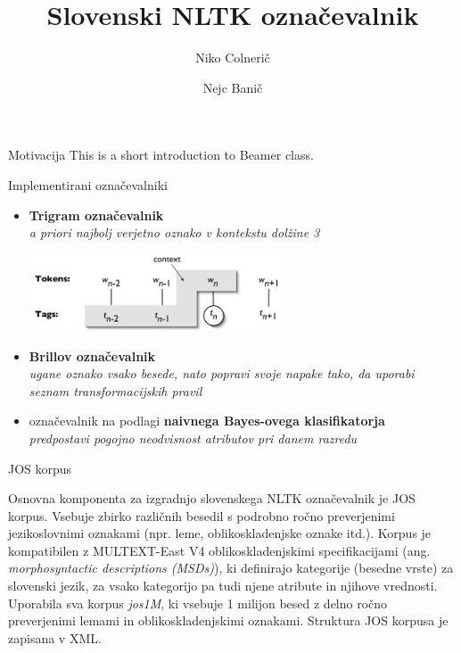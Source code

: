 \documentclass{beamer}
\title[Slovenski NLTK označevalnik]{Slovenski NLTK označevalnik}
\author{
	Niko Colnerič
	\and
	Nejc Banič}
\institute{ Fakulteta za Računalništvo in Informtiko\\
			Univerza v Ljubljani}
\begin{document}
\begin{frame}
\titlepage
\end{frame}

\begin{frame}{Motivacija}
This is a short introduction to Beamer class.
\end{frame}

\begin{frame}{Implementirani označevalniki}
\begin{itemize}
\item \textbf{Trigram označevalnik}\\
\textit{a priori najbolj verjetno oznako v kontekstu dolžine 3}
\begin{center}
\includegraphics[width=0.6\textwidth]{../paper/tag-context.png}
\end{center}

\item \textbf{Brillov označevalnik}\\
\textit{ugane oznako vsako besede, nato 
popravi svoje napake tako, da uporabi seznam transformacijskih pravil}
\item označevalnik na podlagi \textbf{naivnega Bayes-ovega klasifikatorja}\\
\textit{predpostavi pogojno neodvisnost atributov pri danem razredu}
\end{itemize}
\end{frame}

\begin{frame}{JOS korpus}

Osnovna komponenta za izgradnjo slovenskega NLTK označevalnik je JOS korpus. Vsebuje zbirko različnih besedil s podrobno ročno preverjenimi jezikoslovnimi oznakami (npr. leme, oblikoskladenjske oznake itd.). Korpus je kompatibilen z MULTEXT-East V4 oblikoskladenjskimi specifikacijami (ang. \textit{morphosyntactic descriptions (MSDs)}), ki definirajo kategorije (besedne vrste) za slovenski jezik, za vsako kategorijo pa tudi njene atribute in njihove vrednosti. Uporabila sva korpus \textit{jos1M}, ki vsebuje 1 milijon besed z delno ročno preverjenimi lemami in oblikoskladenjskimi oznakami. Struktura JOS korpusa je zapisana v XML.
\end{frame}
\end{document}
